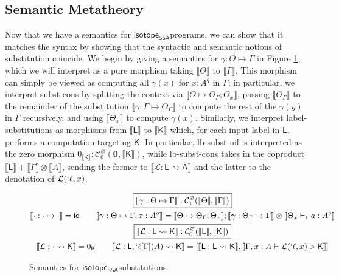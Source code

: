 \documentclass[acmsmall,screen,review]{acmart}
\newcommand{\mc}[1]{\ensuremath{\mathcal{#1}}}
\newcommand{\mb}[1]{\ensuremath{\mathbf{#1}}}
\newcommand{\ms}[1]{\ensuremath{\mathsf{#1}}}
\newcommand{\lbl}[1]{{`#1}}
\newcommand{\csplits}[3]{#1 \mapsto #2;#3}
\newcommand{\thyp}[3]{#1: {#2}^{#3}}
\newcommand{\lhyp}[3]{#1[#2](#3)}
\newcommand{\llhyp}[3]{\lhyp{\lbl{#1}}{#2}{#3}}
\newcommand{\rle}[1]{{\scriptsize\textsf{#1}}}
\newcommand{\hasty}[5]{#1 \vdash_{#2} #3: {#4}^{#5}}
\newcommand{\haslb}[3]{#1 \vdash #2 \rhd #3}
\newcommand{\issubst}[3]{#1: #2 \mapsto #3}
\newcommand{\lbsubst}[3]{#1: #2 \rightsquigarrow #3}
\newcommand{\dnt}[1]{\llbracket{#1}\rrbracket}
\newcommand{\isotopessa}{\ms{isotope_{SSA}}}
\begin{document}
\subsection{Semantic Metatheory}

Now that we have a semantics for \isotopessa programs, we can show that it
matches the syntax by showing that the syntactic and semantic notions of
substitution coincide. We begin by giving a semantics for
\(\issubst{\gamma}{\Theta}{\Gamma}\) in Figure \ref{fig:ssa-subst-semantics},
which we will interpret as a pure morphism taking \(\dnt{\Theta}\) to
\(\dnt{\Gamma}\). This morphism can simply be viewed as computing all
\(\gamma(x)\) for \(\thyp{x}{A}{q}\) in \(\Gamma\); in particular, we interpret
\rle{subst-cons} by splitting the context via
\(\dnt{\csplits{\Theta}{\Theta_\Gamma}{\Theta_x}}\), passing
\(\dnt{\Theta_\Gamma}\) to the remainder of the substitution
\(\dnt{\issubst{\gamma}{\Gamma}{\Theta_\Gamma}}\) to compute the rest of the
\(\gamma(y)\) in \(\Gamma\) recursively, and using \(\dnt{\Theta_x}\) to compute
\(\gamma(x)\). Similarly, we interpret label-substitutions as morphisms from \(\dnt{\ms{L}}\) to
\(\dnt{\ms{K}}\) which, for each input label in \(\ms{L}\), performs a
computation targeting \(\ms{K}\). In particular, \rle{lb-subst-nil} is
interpreted as the zero morphism \(0_{\dnt{\ms{K}}}:
\mc{C}_0^\varnothing(\mb{0}, \dnt{\ms{K}})\), while \rle{lb-subst-cons} takes in
the coproduct \(\dnt{\ms{L}} + \dnt{\Gamma} \otimes \dnt{A}\), sending the
former to \(\dnt{\lbsubst{\mc{L}}{\ms{L}}{\ms{A}}}\) and the latter to the
denotation of \(\mc{L}(\lbl{\ell}, x)\).

\begin{figure}
  \begin{gather*}
    \boxed{\dnt{\issubst{\gamma}{\Theta}{\Gamma}}: \mc{C}_1^\varnothing(\dnt{\Theta}, \dnt{\Gamma})} 
    \\
    \dnt{\issubst{\cdot}{\cdot}{\cdot}} = \ms{id}
    \qquad
    \dnt{\issubst{\gamma}{\Theta}{\Gamma, \thyp{x}{A}{q}}}
      = \dnt{\csplits{\Theta}{\Theta_\Gamma}{\Theta_x}};\dnt{\issubst{\gamma}{\Theta_\Gamma}{\Gamma}} \otimes \dnt{\hasty{\Theta_x}{1}{a}{A}{q}}
    \\
    \boxed{\dnt{\lbsubst{\mc{L}}{\ms{L}}{\ms{K}}}: \mc{C}_0^\varnothing(\dnt{\ms{L}}, \dnt{\ms{K}})} 
    \\
    \dnt{\lbsubst{\mc{L}}{\cdot}{\ms{K}}} = 0_{\ms{K}}
    \qquad
    \dnt{\lbsubst{\mc{L}}{\ms{L}, \llhyp{\ell}{\Gamma}{A}}{\ms{K}}}
    = [\dnt{\lbsubst{\ms{L}}{\ms{L}}{\ms{K}}}, \dnt{\haslb{\Gamma, \thyp{x}{A}{}}{\mc{L}(\lbl{\ell}, x)}{\ms{K}}}]
  \end{gather*}
  \caption{Semantics for \isotopessa substitutions}
  \label{fig:ssa-subst-semantics}
\end{figure}
\end{document}
